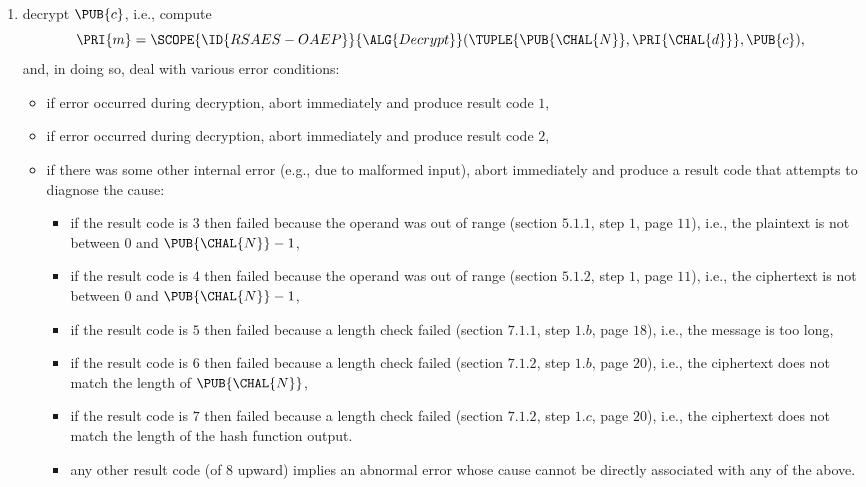 \begin{enumerate}
\item decrypt $\PUB{c}$, i.e., compute
      \[
      \PRI{m} = \SCOPE{\ID{RSAES-OAEP}}{\ALG{Decrypt}}( \TUPLE{ \PUB{\CHAL{N}}, \PRI{\CHAL{d}} }, \PUB{c} ) ,
      \]
      and, in doing so, deal with various error conditions:

      \begin{itemize}
      \item if error  occurred during decryption,
            abort immediately  and produce   result code $1$,
      \item if error  occurred during decryption,
            abort immediately  and produce   result code $2$,
      \item if there was some other internal error 
            (e.g., due to malformed input),
            abort immediately  and produce a result code that attempts to diagnose the cause:

            \begin{itemize}
            \item if the result code is $3$ then               
                  failed because the operand was out of range 
                  (section $5.1.1$, step $1$, page $11$), 
                  i.e., the  plaintext is not between $0$ and $\PUB{\CHAL{N}}-1$,
            \item if the result code is $4$ then               
                  failed because the operand was out of range 
                  (section $5.1.2$, step $1$, page $11$), 
                  i.e., the ciphertext is not between $0$ and $\PUB{\CHAL{N}}-1$,
            \item if the result code is $5$ then  
                  failed because a length check failed        
                  (section $7.1.1$, step $1.b$, page $18$), 
                  i.e., the message is too long,
            \item if the result code is $6$ then  
                  failed because a length check failed        
                  (section $7.1.2$, step $1.b$, page $20$), 
                  i.e., the ciphertext does not match the length of $\PUB{\CHAL{N}}$,
            \item if the result code is $7$ then  
                  failed because a length check failed        
                  (section $7.1.2$, step $1.c$, page $20$), 
                  i.e., the ciphertext does not match the length of the hash function output.
            \item any other result code 
                  (of $8$ upward) 
                  implies an abnormal error whose cause cannot be directly 
                  associated with any of the above.
            \end{itemize}
      

\end{itemize}
\end{enumerate}
